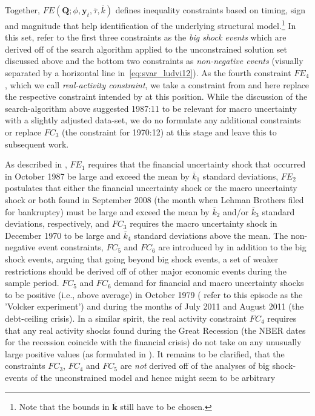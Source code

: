 \documentclass[a4paper,11pt,listof=nochaptergap,oneside,pointednumbers,bibtotoc,bigheadings,liststotoc,hidelinks]{scrbook}
\theoremstyle{mysatz}
\theoremstyle{mydefinition}
\theoremstyle{mytheorem}
\theoremstyle{mybemerkung}
\newcommand{\vect}[1]{\boldsymbol{\mathbf{#1}}}
\begin{document}
 Together, $FE(\vect{Q}; \phi, \vect{y}_t, \overline{\tau}, \overline{k})$ defines inequality constraints based on timing, sign and magnitude that help identification of the underlying structural model.\footnote{Note that the bounds in $\overline{\vect{k}}$ still have to be chosen.} In this set, \citet{ludvigsonetal:19} refer to the first three constraints as the \textit{big shock events} which are derived off of the search algorithm applied to the unconstrained solution set discussed above and the bottom two constraints as \textit{non-negative events} (visually separated by a horizontal line in~\ref{eq:svar_ludvi12}). As the fourth constraint $FE_4$, which we call \textit{real-activity constraint}, we take a constraint from \citet{ludvigsonetal:18} and here replace the respective constraint intended by \citet{ludvigsonetal:19} at this position. While the discussion of the search-algorithm above suggested 1987:11 to be relevant for macro uncertainty with a slightly adjusted data-set, we do no formulate any additional constraints or replace $FC_3$ (the constraint for 1970:12) at this stage and leave this to subsequent work.

As described in \citet{ludvigsonetal:19}, $FE_1$ requires that the financial uncertainty shock that occurred in October 1987 be large and exceed the mean by $\overline{k}_1$ standard deviations, $FE_2$ postulates that either the financial uncertainty shock or the macro uncertainty shock or both found in September 2008 (the month when Lehman Brothers filed for bankruptcy) must be large and exceed the mean by $\overline{k}_2$ and/or $\overline{k}_3$ standard deviations, respectively, and $FC_3$ requires the macro uncertainty shock in December 1970 to be large and $\overline{k}_4$ standard deviations above the mean. The non-negative event constraints, $FC_5$ and $FC_6$ are introduced by \citet{ludvigsonetal:19} in addition to the big shock events, arguing that going beyond big shock events, a set of weaker restrictions should be derived off of other major economic events during the sample period. $FC_5$ and $FC_6$ demand for financial and macro uncertainty shocks to be positive (i.e., above average) in October 1979 (\citet{ludvigsonetal:19} refer to this episode as the 'Volcker experiment') and during the months of July 2011 and August 2011 (the debt-ceiling crisis). In a similar spirit, the real activity constraint $FC_4$ requires that any real activity shocks found during the Great Recession (the NBER dates for the recession coincide with the financial crisis) do not take on any unusually large positive values (as formulated in \citealp{ludvigsonetal:18}). It remains to be clarified, that the constraints $FC_3$, $FC_4$ and $FC_5$ are \textit{not} derived off of the analyses of big shock-events of the unconstrained model and hence might seem to be arbitrary
\end{document}
